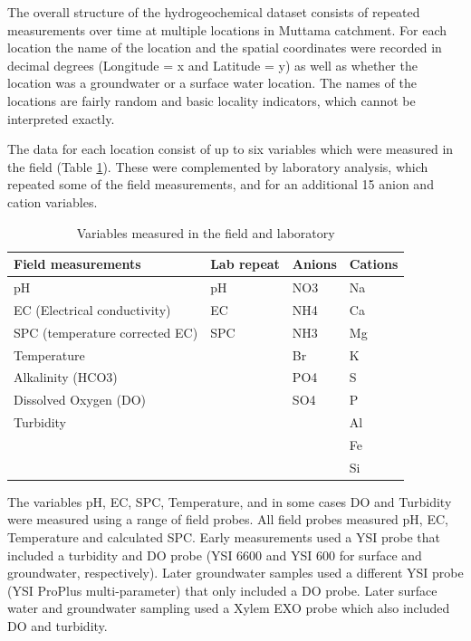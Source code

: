 \documentclass[, manuscript]{copernicus}
\begin{document}
The overall structure of the hydrogeochemical dataset consists of
repeated measurements over time at multiple locations in Muttama
catchment. For each location the name of the location and the spatial
coordinates were recorded in decimal degrees (Longitude = x and Latitude
= y) as well as whether the location was a groundwater or a surface
water location. The names of the locations are fairly random and basic
locality indicators, which cannot be interpreted exactly.

The data for each location consist of up to six variables which were
measured in the field (Table \ref{tab:TableMeasurements}). These were
complemented by laboratory analysis, which repeated some of the field
measurements, and for an additional 15 anion and cation variables.

\clearpage
\begin{table}

\caption{\label{tab:TableMeasurements}Variables measured in the field and laboratory}
\centering
\begin{tabular}[t]{l|l|l|l}
\hline
Field measurements & Lab repeat & Anions & Cations\\
\hline
pH & pH & NO3 & Na\\
\hline
EC (Electrical conductivity) & EC & NH4 & Ca\\
\hline
SPC (temperature corrected EC) & SPC & NH3 & Mg\\
\hline
Temperature &  & Br & K\\
\hline
Alkalinity (HCO3) &  & PO4 & S\\
\hline
Dissolved Oxygen (DO) &  & SO4 & P\\
\hline
Turbidity &  &  & Al\\
\hline
 &  &  & Fe\\
\hline
 &  &  & Si\\
\hline
\end{tabular}
\end{table}

The variables pH, EC, SPC, Temperature, and in some cases DO and
Turbidity were measured using a range of field probes. All field probes
measured pH, EC, Temperature and calculated SPC. Early measurements used
a YSI probe that included a turbidity and DO probe (YSI 6600 and YSI 600
for surface and groundwater, respectively). Later groundwater samples
used a different YSI probe (YSI ProPlus multi-parameter) that only
included a DO probe. Later surface water and groundwater sampling used a
Xylem EXO probe which also included DO and turbidity.
\end{document}
